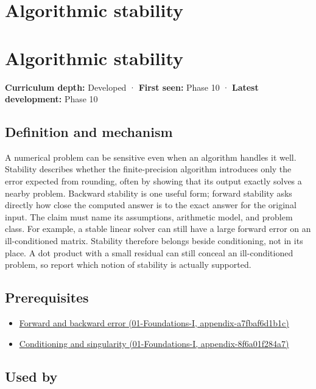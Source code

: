 \hypertarget{appendix-aa2bf0d79639}{}
\section*{Algorithmic stability}
\section{Algorithmic stability}\label{appendix-aa2bf0d79639-algorithmic-stability}

\textbf{Curriculum depth:} Developed · \textbf{First seen:} Phase 10 · \textbf{Latest development:} Phase 10

\subsection{Definition and mechanism}\label{appendix-aa2bf0d79639-definition-and-mechanism}

A numerical problem can be sensitive even when an algorithm handles it well. Stability describes whether the finite-precision algorithm introduces only the error expected from rounding, often by showing that its output exactly solves a nearby problem. Backward stability is one useful form; forward stability asks directly how close the computed answer is to the exact answer for the original input. The claim must name its assumptions, arithmetic model, and problem class. For example, a stable linear solver can still have a large forward error on an ill-conditioned matrix. Stability therefore belongs beside conditioning, not in its place. A dot product with a small residual can still conceal an ill-conditioned problem, so report which notion of stability is actually supported.

\subsection{Prerequisites}\label{appendix-aa2bf0d79639-prerequisites}

\begin{itemize}
\tightlist
\item
  \href{../01-Foundations-I/main.pdf\#nameddest=appendix-a7fbaf6d1b1c}{Forward and backward error (01-Foundations-I, appendix-a7fbaf6d1b1c)}
\item
  \href{../01-Foundations-I/main.pdf\#nameddest=appendix-8f6a01f284a7}{Conditioning and singularity (01-Foundations-I, appendix-8f6a01f284a7)}
\end{itemize}

\subsection{Used by}\label{appendix-aa2bf0d79639-used-by}


